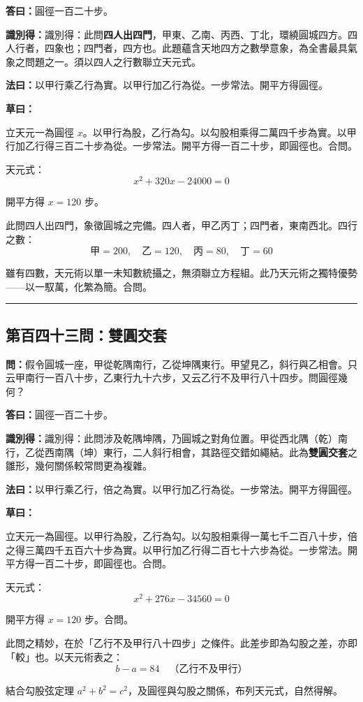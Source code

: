 \documentclass[11pt,a4paper]{article}
\newcommand{\longline}{\noindent\rule{\textwidth}{0.4pt}}
\newcommand{\wen}[1]{\par\noindent\textbf{\textcolor{probcolor}{問：}}{#1}\par}
\newcommand{\da}[1]{\par\noindent\textbf{\textcolor{anscolor}{答曰：}}{#1}\par}
\newcommand{\fayue}[1]{\par\noindent\textbf{\textcolor{methodcolor}{法曰：}}{#1}\par}
\newcommand{\caoyue}[1]{\par\noindent\textbf{草曰：}{#1}\par}
\newcommand{\zhi}[1]{\par\noindent\textbf{識別得：}{#1}\par}
\begin{document}
\da{圓徑一百二十步。}

\zhi{識別得：此問\textbf{四人出四門}，甲東、乙南、丙西、丁北，環繞圓城四方。四人行者，四象也；四門者，四方也。此題蘊含天地四方之數學意象，為全書最具氣象之問題之一。須以四人之行數聯立天元式。}

\fayue{以甲行乘乙行為實。以甲行加乙行為從。一步常法。開平方得圓徑。}

\caoyue{
立天元一為圓徑 $x$。以甲行為股，乙行為勾。以勾股相乘得二萬四千步為實。以甲行加乙行得三百二十步為從。一步常法。開平方得一百二十步，即圓徑也。合問。

天元式：
$$x^2 + 320x - 24000 = 0$$

開平方得 $x = 120$ 步。

此問四人出四門，象徵圓城之完備。四人者，甲乙丙丁；四門者，東南西北。四行之數：
$$\text{甲} = 200, \quad \text{乙} = 120, \quad \text{丙} = 80, \quad \text{丁} = 60$$

雖有四數，天元術以單一未知數統攝之，無須聯立方程組。此乃天元術之獨特優勢——以一馭萬，化繁為簡。合問。
}

\vspace{0.5cm}
\longline

\subsection*{第百四十三問：雙圓交套}
\wen{假令圓城一座，甲從乾隅南行，乙從坤隅東行。甲望見乙，斜行與乙相會。只云甲南行一百八十步，乙東行九十六步，又云乙行不及甲行八十四步。問圓徑幾何？}

\da{圓徑一百二十步。}

\zhi{識別得：此問涉及乾隅坤隅，乃圓城之對角位置。甲從西北隅（乾）南行，乙從西南隅（坤）東行，二人斜行相會，其路徑交錯如繩結。此為\textbf{雙圓交套}之雛形，幾何關係較常問更為複雜。}

\fayue{以甲行乘乙行，倍之為實。以甲行加乙行為從。一步常法。開平方得圓徑。}

\caoyue{
立天元一為圓徑。以甲行為股，乙行為勾。以勾股相乘得一萬七千二百八十步，倍之得三萬四千五百六十步為實。以甲行加乙行得二百七十六步為從。一步常法。開平方得一百二十步，即圓徑也。合問。

天元式：
$$x^2 + 276x - 34560 = 0$$

開平方得 $x = 120$ 步。合問。

此問之精妙，在於「乙行不及甲行八十四步」之條件。此差步即為勾股之差，亦即「較」也。以天元術表之：
$$b - a = 84 \quad \text{（乙行不及甲行）}$$

結合勾股弦定理 $a^2 + b^2 = c^2$，及圓徑與勾股之關係，布列天元式，自然得解。
}
\end{document}
